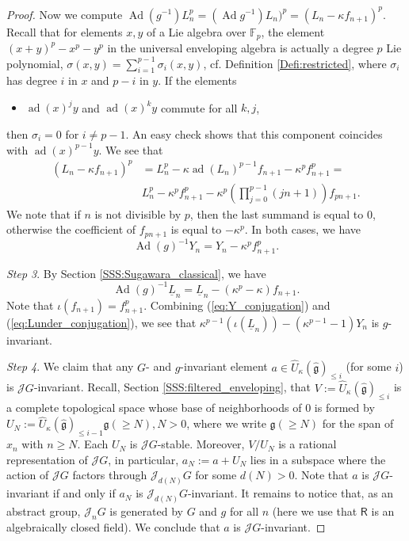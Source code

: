 \documentclass{amsart}
\theoremstyle{definition}
\newcommand{\Ring}{\mathsf{R}}
\newcommand{\g}{\mathfrak{g}}
\newcommand{\hg}{\hat{\mathfrak{g}}}
\newcommand{\F}{\mathbb{F}}
\newcommand{\Jet}{\mathscr{J}}
\numberwithin{equation}{section}
\begin{document}
\begin{proof}
Now we compute $\operatorname{Ad}(g^{-1})L_n^p=(\operatorname{Ad}g^{-1})L_n)^p=(L_n-\kappa f_{n+1})^p$. Recall that for elements $x,y$ of 
a Lie algebra over $\F_p$, the element $(x+y)^p-x^p-y^p$ in the universal 
enveloping algebra is actually a degree $p$ Lie polynomial,  $\sigma(x,y)=\sum_{i=1}^{p-1}\sigma_i(x,y)$, cf. Definition \ref{Defi:restricted}, where $\sigma_i$ has degree $i$ in $x$ and $p-i$ in $y$. 
If the elements 
\begin{itemize}
\item[(*)]
$\operatorname{ad}(x)^j y$ and $\operatorname{ad}(x)^k y$ commute 
for all $k,j$, 
\end{itemize}
then $\sigma_i=0$ for $i\neq p-1$. An easy check shows that this component coincides with
$\operatorname{ad}(x)^{p-1}y$. We see that 
\begin{align*}
(L_n-\kappa f_{n+1})^p&=L_n^p-\kappa\operatorname{ad}(L_n)^{p-1}f_{n+1}-\kappa^p f_{n+1}^p=\\&L_n^p-\kappa^{p}f_{n+1}^p-\kappa^{p}\left(\prod_{j=0}^{p-1}(jn+1)\right)f_{pn+1}.
\end{align*} We note that if $n$ is not divisible by $p$, then the last summand is equal to $0$, otherwise the coefficient of $f_{pn+1}$ is equal
to $-\kappa^p$. In both cases, we have 
\begin{equation}\label{eq:Y_conjugation}
\operatorname{Ad}(g)^{-1}Y_n=Y_n-\kappa^p f_{n+1}^p.    
\end{equation}

{\it Step 3}. By Section \ref{SSS:Sugawara_classical}, we have 
\begin{equation}\label{eq:Lunder_conjugation}
\operatorname{Ad}(g)^{-1}\underline{L}_n=\underline{L}_n-(\kappa^p-\kappa)f_{n+1}. 
\end{equation}
Note that $\iota(f_{n+1})=f_{n+1}^p$. Combining 
(\ref{eq:Y_conjugation}) and (\ref{eq:Lunder_conjugation}), we see that 
$\kappa^{p-1}(\iota(\underline{L}_n))-(\kappa^{p-1}-1)Y_n$ is $g$-invariant.

{\it Step 4}. We claim that any $G$- and $g$-invariant element  
$a\in\widehat{U}_\kappa(\hg)_{\leqslant i}$ (for some $i$) is $\Jet G$-invariant. Recall, Section \ref{SSS:filtered_enveloping}, that $V:=\widehat{U}_\kappa(\hg)_{\leqslant i}$ is a complete topological space whose base of neighborhoods of $0$ is formed by $U_N:=\widehat{U}_\kappa(\hg)_{\leqslant i-1}\g(\geqslant N), N>0$, where we write $\g(\geqslant N)$ for the span of $x_n$ with $n\geqslant N$. Each $U_N$ is $\Jet G$-stable. Moreover, $V/U_N$ is a rational representation of $\Jet G$, in particular, $a_N:=a+U_N$ lies in a subspace where the action of $\Jet G$ factors through $\Jet_{d(N)}G$ for some $d(N)>0$.
Note that $a$ is $\Jet G$-invariant if and only if $a_N$ is $\Jet_{d(N)}G$-invariant. It remains to notice that, as an abstract group, $\Jet_n G$ is generated by $G$ and $g$ for all $n$ (here we use  that $\Ring$ is an algebraically closed field). We conclude that $a$ is $\Jet G$-invariant.


\end{proof}
\end{document}
